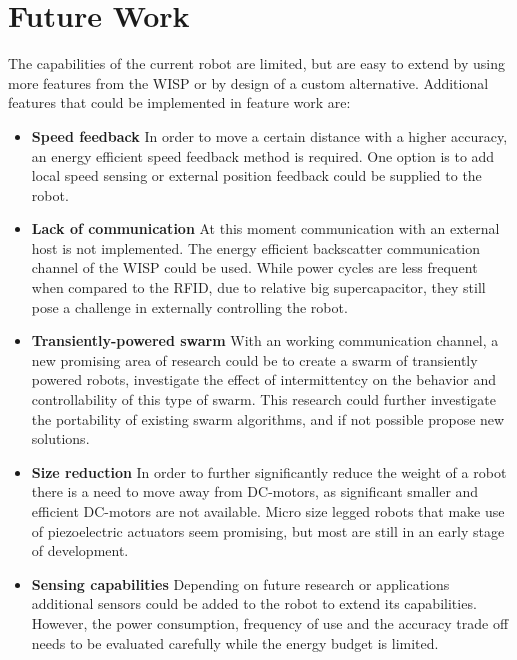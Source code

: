 \section{Future Work}
\label{sec:limitations_future_work}

The capabilities of the current robot are limited, but are easy to extend by using more features from the WISP or by design of a custom alternative.
Additional features that could be implemented in feature work are:

\begin{itemize}

\item \textbf{Speed feedback} 
In order to move a certain distance with a higher accuracy, an energy efficient speed feedback method is required.
One option is to add local speed sensing or external position feedback could be supplied to the robot.


\item \textbf{Lack of communication}
At this moment communication with an external host is not implemented.
The energy efficient backscatter communication channel of the WISP could be used.
While power cycles are less frequent when compared to the RFID, due to relative big supercapacitor, they still pose a challenge in externally controlling the robot.

\item \textbf{Transiently-powered swarm}
With an working communication channel, a new promising area of research could be to create a swarm of transiently powered robots, investigate the effect of intermittentcy on the behavior and controllability of this type of swarm.
This research could further investigate the portability of existing swarm algorithms, and if not possible propose new solutions.	

\item \textbf{Size reduction} 
In order to further significantly reduce the weight of a robot there is a need to move away from DC-motors, as significant smaller and efficient DC-motors are not available.
Micro size legged robots that make use of piezoelectric actuators seem promising, but most are still in an early stage of development.

\item \textbf{Sensing capabilities}
Depending on future research or applications additional sensors could be added to the robot to extend its capabilities.
However, the power consumption, frequency of use and the accuracy trade off needs to be evaluated carefully while the energy budget is limited.


\end{itemize}

